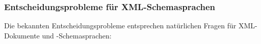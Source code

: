     \begin{frame}
      \frametitle{Entscheidungsprobleme für XML-Schemasprachen}

      Die bekannten Entscheidungsprobleme
      entsprechen natürlichen Fragen für XML-Dokumente und -Schemasprachen:



\end{frame}
